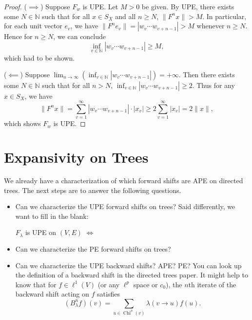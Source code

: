 \documentclass{article}
\newcommand{\ds}{\displaystyle}
\theoremstyle{definition}\newtheorem{remark}[theorem]{Remark}
\theoremstyle{definition}\newtheorem{example}[theorem]{Example}
\theoremstyle{definition}\newtheorem{fact}[theorem]{Fact}
\theoremstyle{definition}\newtheorem{diagram}[theorem]{Diagram}
\theoremstyle{definition}\newtheorem{definition}[theorem]{Definition}
\theoremstyle{definition}\newtheorem{question}[theorem]{Question}
\newcommand{\N}{\mathbb{N}}
\DeclareMathOperator{\Child}{Chi}
\begin{document}
\begin{proof}
    ($\implies$) Suppose $F_w$ is UPE. Let $M>0$ be given. By UPE, there exists some $N\in \N$ such that for all $x\in S_X$ and all $n\geq N$, $\|F^n x\|>M$. In particular, for each unit vector $e_v$, we have $\|F^n e_v\|=|w_v\cdots w_{v+n-1}|>M$ whenever $n\geq N$. Hence for $n\geq N$, we can conclude
    \[\inf_{v\in \N} |w_v\cdots w_{v+n-1}|\geq M,\]
    which had to be shown.

    ($\impliedby$) Suppose $\ds\lim_{n\to \infty} (\inf_{v\in \N} |w_v\cdots w_{v+n-1}|)=+\infty.$ Then there exists some $N\in \N$ such that for all $n>N$, $\inf_{v\in \N} |w_v\cdots w_{v+n-1}|\geq 2$. Thus for any $x\in S_X$, we have 
    \[\|F^n x\|=\sum_{v=1}^\infty |w_v\cdots w_{v+n-1}|\cdot |x_v| \geq 2 \sum_{v=1}^\infty |x_v|=2\|x\|,\]
    which shows $F_w$ is UPE.
\end{proof}

\section{Expansivity on Trees}
We already have a characterization of which forward shifts are APE on directed trees. The next steps are to answer the following questions.
\begin{itemize}
    \item Can we characterize the UPE forward shifts on trees? Said differently, we want to fill in the blank:

    $F_\lambda$ is UPE on $(V,E)$ $\iff$ \underline{\hspace{3in}}
    \item Can we characterize the PE forward shifts on trees?
    \item Can we characterize the UPE backward shifts? APE? PE? You can look up the definition of a backward shift in the directed trees paper. It might help to know that for $f\in \ell^1(V)$ (or any $\ell^p$ space or $c_0$), the $n$th iterate of the backward shift acting on $f$ satisfies
    \[(B_\lambda^n f)(v)=\sum_{u\in \Child^n(v)} \lambda(v\to u) f(u).\]
\end{itemize}
\end{document}

